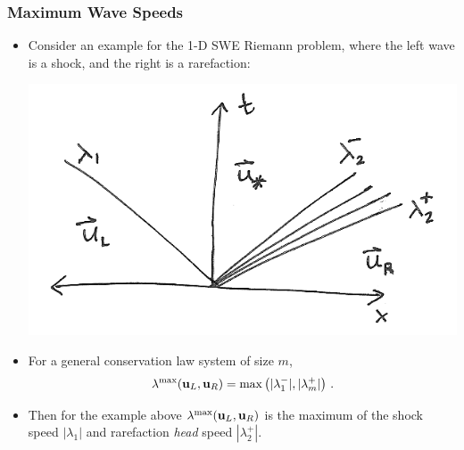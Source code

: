 \documentclass{beamer} \useoutertheme{infolines}
\begin{document}
\begin{frame}
\frametitle{Maximum Wave Speeds}

\begin{itemize}
  \item Consider an example for the 1-D SWE Riemann problem, where the left
    wave is a shock, and the right is a rarefaction:
    \begin{center}
      \includegraphics[height=0.4\textheight]{./figures/characteristic_diagram.png}
    \end{center}
  \item For a general conservation law system of size $m$,
    \begin{equation}
      \maxwavespeed(\vectorsolution_L,\vectorsolution_R)
        = \max\pr{|\lambda_1^-|,|\lambda_m^+|} \eqp
    \end{equation}
  \item Then for the example above
    $\maxwavespeed(\vectorsolution_L,\vectorsolution_R)$ is the maximum of
    the shock speed $|\lambda_1|$ and rarefaction \emph{head} speed $|\lambda_2^+|$.
\end{itemize}

\end{frame}
\end{document}

